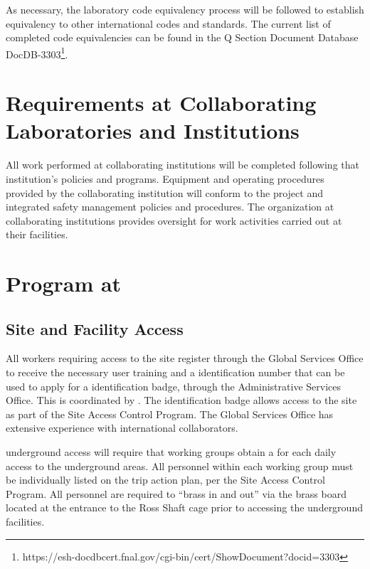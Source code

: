 As necessary, the laboratory code equivalency process will be followed
to establish equivalency to other international codes and
standards. The current list of completed code equivalencies can be
found in the Q Section Document Database DocDB-3303\footnote{https://esh-docdbcert.fnal.gov/cgi-bin/cert/ShowDocument?docid=3303}.


\section{ Requirements at Collaborating Laboratories and Institutions}

All work performed at collaborating institutions will be completed
following that institution's  policies and
programs. Equipment and operating procedures provided by the
collaborating institution will conform to the  project
 and integrated safety management policies and
procedures. The  organization at collaborating institutions
provides  oversight for work activities carried
out at their facilities.

\section{  Program at }

\subsection{Site and Facility Access}

All  workers requiring access to the  site
register through the \fnal Global Services Office to receive the
necessary user training and a \fnal identification number that can be
used to apply for a  identification badge, through the
 Administrative Services Office. This is coordinated by
. The  identification badge allows access to
the  site as part of the  Site Access Control
Program. The \fnal Global Services Office has extensive experience
with international collaborators.


 underground access will require that working groups
obtain a  for each daily access to the
underground areas.  All personnel within each working group must be
individually listed on the trip action plan, per the  Site
Access Control Program. All personnel are required to ``brass in and
out'' via the brass board located at the entrance to the Ross Shaft
cage prior to accessing the underground facilities.

